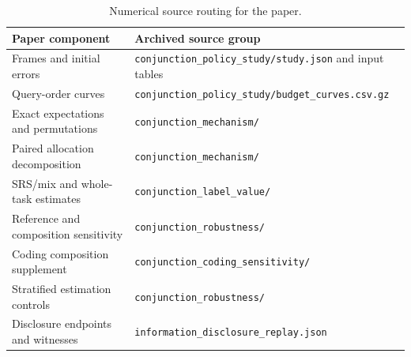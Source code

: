 \begin{table}[ht]
\centering\small
\caption{Numerical source routing for the paper.}
\label{tab:sources}
\begin{tabularx}{\linewidth}{lX}
\toprule
Paper component & Archived source group\\
\midrule
Frames and initial errors & \texttt{conjunction\_policy\_study/study.json} and input tables\\
Query-order curves & \texttt{conjunction\_policy\_study/budget\_curves.csv.gz}\\
Exact expectations and permutations & \texttt{conjunction\_mechanism/}\\
Paired allocation decomposition & \texttt{conjunction\_mechanism/}\\
SRS/mix and whole-task estimates & \texttt{conjunction\_label\_value/}\\
Reference and composition sensitivity & \texttt{conjunction\_robustness/}\\
Coding composition supplement & \texttt{conjunction\_coding\_sensitivity/}\\
Stratified estimation controls & \texttt{conjunction\_robustness/}\\
Disclosure endpoints and witnesses & \texttt{information\_disclosure\_replay.json}\\
\bottomrule
\end{tabularx}
\end{table}
